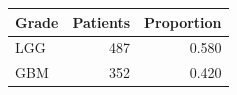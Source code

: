 \begin{tabular}{lrr}
\toprule
\textbf{Grade} & \textbf{Patients} & \textbf{Proportion} \\
\midrule
LGG & 487 & 0.580 \\
GBM & 352 & 0.420 \\
\bottomrule
\end{tabular}
